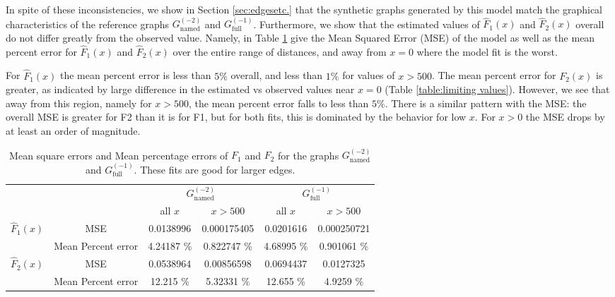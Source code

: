 \documentclass[11]{article}
\newcommand{\namedtwo}{G_{\textrm{named}}^{(-2)}}
\newcommand{\fullone}{G_{\textrm{full}}^{(-1)}}
\theoremstyle{remark}
\theoremstyle{definition}
\begin{document}
In spite of these inconsistencies, we show in Section \ref{sec:edgesetc.} that the synthetic graphs generated by this model match the graphical characteristics of the reference graphs $\namedtwo$ and $\fullone$. Furthermore, we show that the estimated values of $\hat F_1(x)$ and $\hat F_2(x)$ overall do not differ greatly from the observed value. Namely, in Table \ref{table:errors} give the Mean Squared Error (MSE) of the model as well as the mean percent error for $\hat F_1(x)$ and $\hat F_2(x)$ over the entire range of distances, and away from $x = 0$ where the model fit is the worst.

For $\hat F_1(x)$ the mean percent error is less than $5\%$ overall, and less than $1\%$ for values of $x > 500$. The mean percent error for $F_2(x)$ is greater, as indicated by large difference in the estimated vs observed values near $x = 0$ (Table \ref{table:limiting values}). However, we see that away from this region, namely for $x > 500$, the mean percent error falls to less than $5 \%$. There is a similar pattern with the MSE: the overall MSE is greater for F2 than it is for F1, but for both fits, this is dominated by the behavior for low $x$. For $x>0$ the MSE drops by at least an order of magnitude.




  
  
\begin{table}[h!]
\centering
\begin{tabular}{|c|c |c | c || c |c |} \hline
& & \multicolumn{2}{c||}{$\namedtwo$} & \multicolumn{2}{c|}{$\fullone$} \\ \cline{3-6}
  & & all $x$ & $x > 500$  & all $x$ & $x > 500$  \\ \hline
\multirow{2}{*}{$\hat F_1(x)$} & MSE & 0.0138996 & 0.000175405  &  0.0201616 & 0.000250721 \\ \cline{2-6}
& Mean Percent error & 4.24187 \%  & 0.822747 \%  &  4.68995 \% &  0.901061 \%   \\ \hline
\multirow{2}{*}{$\hat F_2(x)$} & MSE & 0.0538964 & 0.00856598  & 0.0694437  & 0.0127325  \\ \cline{2-6}
& Mean Percent error & 12.215 \% & 5.32331 \%  &  12.655 \% & 4.9259 \%  \\ \hline
\end{tabular}
\caption{Mean square errors and  Mean percentage errors of $F_1$ and $F_2$ for the graphs $\namedtwo$ and $\fullone$. These fits are good for larger edges.} 
\label{table:errors}
\end{table}
\end{document}
